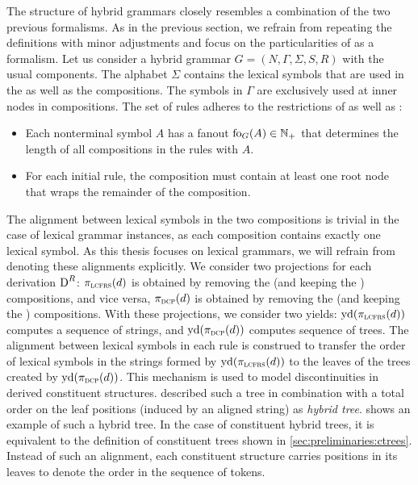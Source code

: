 \documentclass[../../document.tex]{subfiles}
\begin{document}
    The structure of hybrid grammars closely resembles a combination of the two previous formalisms.
    As in the previous section, we refrain from repeating the definitions with minor adjustments and focus on the particularities of  as a formalism.
    Let us consider a hybrid grammar \(G=(N, \varGamma, \varSigma, S, R)\) with the usual components.
    The alphabet \(\varSigma\) contains the lexical symbols that are used in the  as well as the  compositions.
    The symbols in \(\varGamma\) are exclusively used at inner nodes in  compositions.
    The set of rules adheres to the restrictions of  as well as :
    \begin{itemize}
        \item Each nonterminal symbol \(A\) has a fanout \(\operatorname{fo}_G(A) \in \mathbb{N}_+\) that determines the length of all  compositions in the rules with  \(A\).
        \item For each initial rule, the  composition must contain at least one root node that wraps the remainder of the composition.
    \end{itemize}
    The alignment between lexical symbols in the two compositions is trivial in the case of lexical grammar instances, as each composition contains exactly one lexical symbol.
    As this thesis focuses on lexical grammars, we will refrain from denoting these alignments explicitly.
    We consider two projections for each derivation \(\operatorname{D}^R\): \(\pi_{\textsc{lcfrs}}(d)\) is obtained by removing the  (and keeping the ) compositions, and vice versa, \(\pi_{\textsc{dcp}}(d)\) is obtained by removing the  (and keeping the ) compositions.
    With these projections, we consider two yields: \(\operatorname{yd}(\pi_{\textsc{lcfrs}}(d))\) computes a sequence of strings, and \(\operatorname{yd}(\pi_{\textsc{dcp}}(d))\) computes sequence of trees.
    The alignment between lexical symbols in each rule is construed to transfer the order of lexical symbols in the strings formed by \(\operatorname{yd}(\pi_{\textsc{lcfrs}}(d))\) to the leaves of the trees created by \(\operatorname{yd}(\pi_{\textsc{dcp}}(d))\).
    This mechanism is used to model discontinuities in derived constituent structures.
     described such a tree in combination with a total order on the leaf positions (induced by an aligned string) as \emph{hybrid tree}.
     shows an example of such a hybrid tree.
    In the case of constituent hybrid trees, it is equivalent to the definition of constituent trees shown in \cref{sec:preliminaries:ctrees}.
    Instead of such an alignment, each constituent structure carries positions in its leaves to denote the order in the sequence of tokens.
\end{document}
